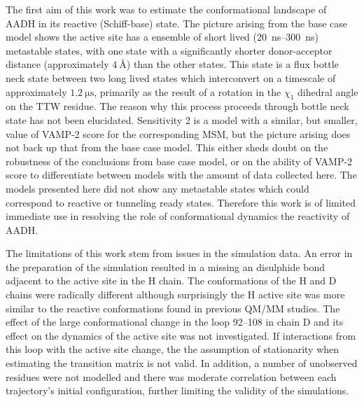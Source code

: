 The first aim of this work was to estimate the conformational landscape of AADH in its reactive (Schiff-base) state. The picture arising from the base case model shows the active site has a ensemble of short lived (\SIrange{20}{300}{\nano\second}) metastable states, with one state with a significantly shorter donor-acceptor distance (approximately $\SI{4}{\angstrom}$) than the other states. This state is a flux bottle neck state between two long lived states which interconvert on a timescale of approximately $\SI{1.2}{\micro\second}$, primarily as the result of a rotation in the $\chi_1$ dihedral angle on the TTW residue. The reason why this process proceeds through bottle neck state has not been elucidated. Sensitivity 2 is a model with a similar, but smaller, value of VAMP-2 score for the corresponding MSM, but the picture arising does not back up that from the base case model. This either sheds doubt on the robustness of the conclusions from base case model, or on the ability of VAMP-2 score to differentiate between models with the amount of data collected here. The models presented here did not show any metastable states which could correspond to reactive or tunneling ready states. Therefore this work is of limited immediate use in resolving the role of conformational dynamics the reactivity of AADH. 

The limitations of this work stem from issues in the simulation data. An error in the preparation of the simulation resulted in a missing an disulphide bond adjacent to the active site in the H chain. The conformations of the H and D chains were radically different although surprisingly the H active site was more similar to the reactive conformations found in previous QM/MM studies. The effect of the large conformational change in the loop \numrange[range-phrase=\text{--}]{92}{108} in chain D and its effect on the dynamics of the active site was not investigated. If interactions from this loop with the active site change, the the assumption of stationarity when estimating the transition matrix is not valid. In addition, a number of unobserved residues were not modelled and there was moderate correlation between each trajectory's initial configuration, further limiting the validity of the simulations. 


